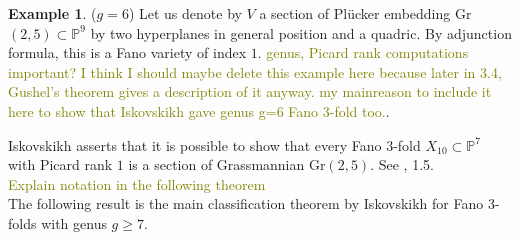 \documentclass[11pt]{amsart}
\theoremstyle{plain}
\theoremstyle{definition}
\newtheorem{example}[theorem]{Example}
\theoremstyle{expl}
\begin{document}
\begin{example}
        ($g=6$) Let us denote by $V$ a section of Pl\"{u}cker embedding Gr$(2,5) \subset \mathbb{P}^9$ by two hyperplanes in general position and a quadric. By adjunction formula, this is a Fano variety of index $1$. \textcolor{olive}{genus, Picard rank computations important? I think I should maybe delete this example here because later in 3.4, Gushel's theorem gives a description of it anyway. my mainreason to include it here to show that Iskovskikh gave genus g=6 Fano $3$-fold too.}.
\end{example}
Iskovskikh asserts that it is possible to show that every Fano $3$-fold $X_{10} \subset \mathbb{P}^7$ with Picard rank $1$ is a section of Grassmannian Gr$(2,5)$. See \cite{Isk78}, 1.5.\\
\textcolor{olive}{Explain notation in the following theorem}\\
The following result is the main classification theorem by Iskovskikh for Fano $3$-folds with genus $g\geq 7$. 
\end{document}
